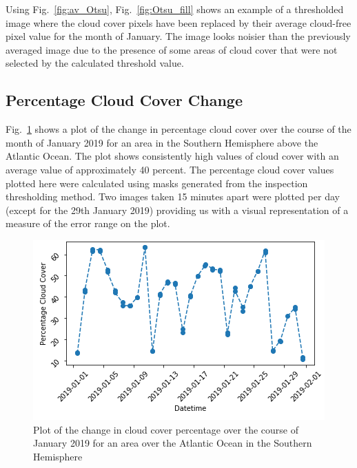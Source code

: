 Using Fig.~\ref{fig:av_Otsu}, Fig.~\ref{fig:Otsu_fill} shows an example of a thresholded image where the cloud cover pixels have been replaced by their average cloud-free pixel value for the month of January. The image looks noisier than the previously averaged image due to the presence of some areas of cloud cover that were not selected by the calculated threshold value.\\

\subsection{Percentage Cloud Cover Change}

Fig.~\ref{fig:cloud_pc_jan} shows a plot of the change in percentage cloud cover over the course of the month of January 2019 for an area in the Southern Hemisphere above the Atlantic Ocean. The plot shows consistently high values of cloud cover with an average value of approximately 40 percent. The percentage cloud cover values plotted here were calculated using masks generated from the inspection thresholding method. Two images taken 15 minutes apart were plotted per day (except for the 29th January 2019) providing us with a visual representation of a measure of the error range on the plot.
\begin{figure}[hbt!]
    \centering
    \includegraphics[totalheight=0.3\textheight]{cloud_percent_jan_southsea_not.png}
    \caption{Plot of the change in cloud cover percentage over the course of January 2019 for an area over the Atlantic Ocean in the Southern Hemisphere}
    \label{fig:cloud_pc_jan}
\end{figure}

